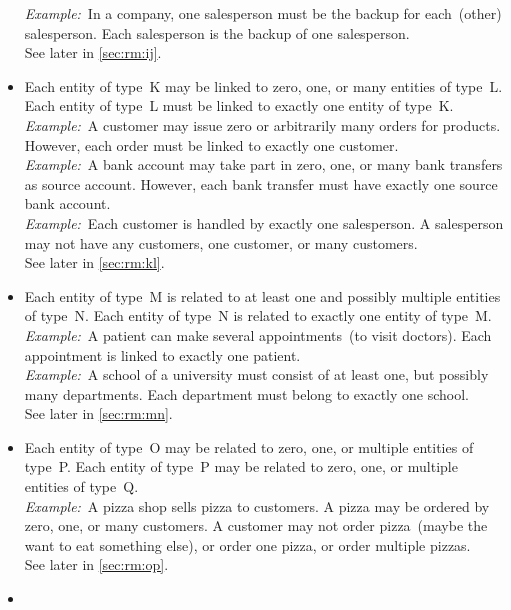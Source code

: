 \begin{itemize}
\emph{Example:}~In a company, one salesperson must be the backup for each~(other) salesperson.
Each salesperson is the backup of one salesperson.~\cite{T2025CDBMS:ERM}\\%
See later in \cref{sec:rm:ij}.%
%
\item {}
Each entity of type~K may be linked to zero, one, or many entities of type~L.
Each entity of type~L must be linked to exactly one entity of type~K.~\cite{MA2006MAC:DMERDED,BS2023G:CFNIERD}\\%
\emph{Example:}~A customer may issue zero or arbitrarily many orders for products.
However, each order must be linked to exactly one customer.~\cite{BS2023G:CFNIERD}\\%
\emph{Example:}~A bank account may take part in zero, one, or many bank transfers as source account.
However, each bank transfer must have exactly one source bank account.~\cite{MA2006MAC:DMERDED}\\%
\emph{Example:}~Each customer is handled by exactly one salesperson.
A salesperson may not have any customers, one customer, or many customers.~\cite{T2025CDBMS:ERM}\\%
See later in \cref{sec:rm:kl}.%
%
\item {}
Each entity of type~M is related to at least one and possibly multiple entities of type~N.
Each entity of type~N is related to exactly one entity of type~M.~\cite{BS2023G:EDFAHMSCFN}\\%
\emph{Example:}~A patient can make several appointments~(to visit doctors).
Each appointment is linked to exactly one patient.~\cite{BS2023G:EDFAHMSCFN}\\%
\emph{Example:}~A school of a university must consist of at least one, but possibly many departments.
Each department must belong to exactly one school.~\cite{R2024CDS:E}\\%
See later in \cref{sec:rm:mn}.%
%
\item {}
Each entity of type~O may be related to zero, one, or multiple entities of type~P.
Each entity of type~P may be related to zero, one, or multiple entities of type~Q.\\%
\emph{Example:}~A pizza shop sells pizza to customers.
A pizza may be ordered by zero, one, or many customers.
A customer may not order pizza~(maybe the want to eat something else), or order one pizza, or order multiple pizzas.~\cite{FCC2016D:CFNRSAHTRD}\\%
See later in \cref{sec:rm:op}.%
%
\item {}

\end{itemize}
